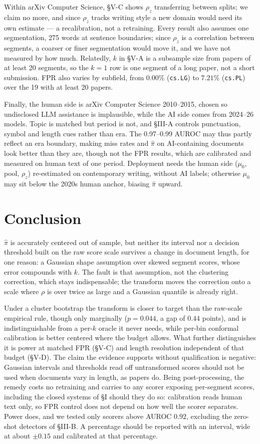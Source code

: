 \documentclass[10pt,conference,a4paper]{IEEEtran}
\newcommand{\sect}[1]{\S#1}
\begin{document}
Within arXiv Computer Science, \sect{V-C} shows $\rho_z$ transferring between splits;
we claim no more, and since $\rho_z$ tracks writing style a new domain would need its
own estimate --- a recalibration, not a retraining. Every
result also assumes one segmentation, 275 words at sentence boundaries; since $\rho_z$
is a correlation between segments, a coarser or finer segmentation would move it, and we have
not measured by how much. Relatedly, $k$ in
\sect{V-A} is a subsample size from papers of at least 20 segments, so the $k{=}1$ row
is one segment of a long paper, not a short submission. FPR also varies by subfield,
from $0.00\%$ (\texttt{cs.LG}) to $7.21\%$ (\texttt{cs.PL}) over the 19 with at least 20
papers.

Finally, the human side is arXiv Computer Science 2010--2015, chosen so undisclosed
LLM assistance is implausible, while the AI side comes from 2024--26 models. Topic is matched but period is not, and \sect{III-A} controls punctuation, symbol and
length cues rather than era. The 0.97--0.99 AUROC may thus partly reflect an era
boundary, making miss rates and $\hat{\pi}$ on AI-containing documents look better than they are, though not
the FPR results, which are calibrated and measured on human text of one period.
Deployment needs the human side ($\mu_0$, pool, $\rho_z$) re-estimated on contemporary
writing, without AI labels; otherwise $\mu_0$ may sit below the 2020s human anchor,
biasing $\hat{\pi}$ upward.

\section{Conclusion}
$\hat{\pi}$ is accurately centered out of sample, but neither its interval nor a
decision threshold built on the raw score scale survives a change in document length,
for one reason: a Gaussian shape assumption over skewed segment scores, whose error
compounds with $k$. The fault is that assumption, not the clustering correction, which
stays indispensable; the transform moves the correction onto a scale where $\rho$ is
over twice as large and a Gaussian quantile is already right.

Under a cluster bootstrap the transform is closer to target than the raw-scale
empirical rule, though only marginally ($p=0.044$, a gap of $0.44$ points), and is
indistinguishable from a per-$k$ oracle it never needs, while per-bin
conformal calibration is better centered where the budget allows. What further
distinguishes it is power at matched FPR (\sect{V-C}) and length resolution independent
of that budget (\sect{V-D}). The claim the evidence supports without qualification is
negative: Gaussian intervals and thresholds read off untransformed scores should not be
used when documents vary in length, as papers do. Being post-processing, the remedy
costs no retraining and carries to any scorer exposing per-segment scores, including the
closed systems of \sect{I} should they do so: calibration reads human text only, so FPR
control does not depend on how well the scorer separates. Power does, and we tested only
scorers above AUROC $0.92$, excluding the zero-shot detectors of \sect{III-B}. A
percentage should be reported
with an interval, wide at about $\pm0.15$ and calibrated at that percentage.
\end{document}
